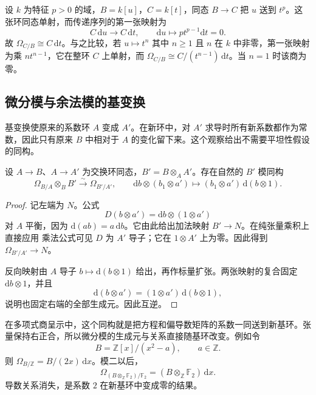 \begin{example}\label{g5:exm:inseparable-transitivity}
	设 \(k\) 为特征 \(p>0\) 的域，\(B=k[u]\)，\(C=k[t]\)，同态 \(B\to C\) 把 \(u\) 送到 \(t^p\)。这张环同态单射，而传递序列的第一张映射为
	\[
		C\,\mathrm{d}u\longrightarrow C\,\mathrm{d}t,
		\qquad \mathrm{d}u\longmapsto p t^{p-1}\mathrm{d}t=0.
	\]
	故 \(\Omega_{C/B}\cong C\,\mathrm{d}t\)。与之比较，若 \(u\mapsto t^n\) 其中 \(n\geq1\) 且 \(n\) 在 \(k\) 中非零，第一张映射为乘 \(nt^{n-1}\)，它在整环 \(C\) 上单射，而
	\(\Omega_{C/B}\cong C/(t^{n-1})\,\mathrm{d}t\)。当 \(n=1\) 时该商为零。
\end{example}

\subsection{微分模与余法模的基变换}
\label{g5:subsec:0502:03}

基变换使原来的系数环 \(A\) 变成 \(A'\)。在新环中，对 \(A'\) 求导时所有新系数都作为常数，因此只有原来 \(B\) 中相对于 \(A\) 的变化留下来。这个观察给出不需要平坦性假设的同构。

\begin{proposition}\label{g5:prop:differentials-base-change}
	设 \(A\to B\)、\(A\to A'\) 为交换环同态，\(B'=B\otimes_A A'\)。存在自然的 \(B'\) 模同构
	\[
		\Omega_{B/A}\otimes_B B'\xrightarrow{\ \sim\ }\Omega_{B'/A'},
		\qquad
		\mathrm{d}b\otimes(b_1\otimes a')
		\longmapsto (b_1\otimes a')\,\mathrm{d}(b\otimes1).
	\]
\end{proposition}
\begin{proof}
	记左端为 \(N\)。公式
	\[
		D(b\otimes a')=\mathrm{d}b\otimes(1\otimes a')
	\]
	对 \(A\) 平衡，因为 \(\mathrm{d}(ab)=a\,\mathrm{d}b\)。它由此给出加法映射 \(B'\to N\)。在纯张量乘积上直接应用 乘法公式可见 \(D\) 为 \(A'\) 导子；它在 \(1\otimes A'\) 上为零。因此得到 \(\Omega_{B'/A'}\to N\)。

	反向映射由 \(A\) 导子 \(b\mapsto\mathrm{d}(b\otimes1)\) 给出，再作标量扩张。两张映射的复合固定 \(\mathrm{d}b\otimes1\)，并且
	\[
		\mathrm{d}(b\otimes a')=(1\otimes a')\,\mathrm{d}(b\otimes1),
	\]
	说明也固定右端的全部生成元。因此互逆。
\end{proof}

在多项式商呈示中，这个同构就是把方程和偏导数矩阵的系数一同送到新基环。张量保持右正合，所以微分模的生成元与关系直接随基环改变。例如令
\[
	B=\mathbb Z[x]/(x^2-a),\qquad a\in\mathbb Z.
\]
则 \(\Omega_{B/\mathbb Z}=B/(2x)\,\mathrm{d}x\)。模二以后，
\[
	\Omega_{(B\otimes_{\mathbb Z}\mathbb F_2)/\mathbb F_2}
	=(B\otimes_{\mathbb Z}\mathbb F_2)\,\mathrm{d}x.
\]
导数关系消失，是系数 \(2\) 在新基环中变成零的结果。

